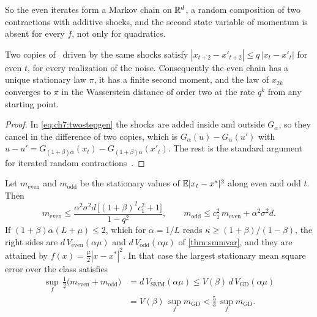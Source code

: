 So the even iterates form a Markov chain on $\mathbb{R}^d$, a random composition of two contractions with additive shocks, and the second state variable of momentum is absent for every $f$, not only for quadratics.

\begin{proposition}\label{prop:ch7:sync}
Two copies of \smmdet\ driven by the same shocks satisfy $|x_{t+2}-x'_{t+2}|\le q\,|x_t-x'_t|$ for even $t$, for every realization of the noise. Consequently the even chain has a unique stationary law $\pi$, it has a finite second moment, and the law of $x_{2k}$ converges to $\pi$ in the Wasserstein distance of order two at the rate $q^k$ from any starting point.
\end{proposition}

\begin{proof}
In \eqref{eq:ch7:twostepgen} the shocks are added inside and outside $G_\alpha$, so they cancel in the difference of two copies, which is $G_\alpha(u)-G_\alpha(u')$ with $u-u'=G_{(1+\beta)\alpha}(x_t)-G_{(1+\beta)\alpha}(x'_t)$. The rest is the standard argument for iterated random contractions~\cite{diaconis1999}.
\end{proof}

\begin{theorem}\label{thm:ch7:class}
Let $m_{\mathrm{even}}$ and $m_{\mathrm{odd}}$ be the stationary values of $\mathbb{E}|x_t-x^\ast|^2$ along even and odd $t$. Then
\begin{equation}\label{eq:ch7:classbound}
  m_{\mathrm{even}}\le\frac{\alpha^2\sigma^2d\,\bigl[(1+\beta)^2c_1^2+1\bigr]}{1-q^2},\qquad
  m_{\mathrm{odd}}\le c_1^2\,m_{\mathrm{even}}+\alpha^2\sigma^2d .
\end{equation}
If $(1+\beta)\alpha(L+\mu)\le2$, which for $\alpha=1/L$ reads $\kappa\ge(1+\beta)/(1-\beta)$, the right sides are $d\,V_{\mathrm{even}}(\alpha\mu)$ and $d\,V_{\mathrm{odd}}(\alpha\mu)$ of \cref{thm:smmvar}, and they are attained by $f(x)=\tfrac\mu2|x-x^\ast|^2$. In that case the largest stationary mean square error over the class satisfies
\begin{align*}
  \sup_f\,\tfrac12\bigl(m_{\mathrm{even}}+m_{\mathrm{odd}}\bigr)&=d\,V_{\mathrm{SMM}}(\alpha\mu)\le V(\beta)\,d\,V_{\mathrm{GD}}(\alpha\mu)\\
  &=V(\beta)\,\sup_f m_{\mathrm{GD}}<\tfrac53\,\sup_f m_{\mathrm{GD}} .
\end{align*}
\end{theorem}

